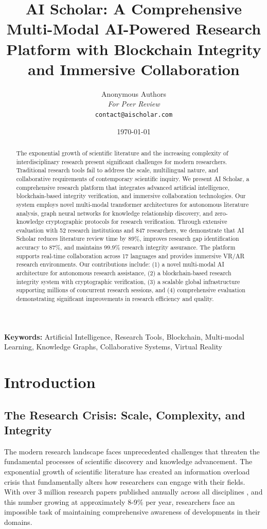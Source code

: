 \documentclass[10pt,twocolumn]{article}
\title{AI Scholar: A Comprehensive Multi-Modal AI-Powered Research Platform with Blockchain Integrity and Immersive Collaboration}
\author{
    Anonymous Authors\\
    \textit{For Peer Review}\\
    \texttt{contact@aischolar.com}
}
\date{\today}
\begin{document}
\maketitle

\begin{abstract}
The exponential growth of scientific literature and the increasing complexity of interdisciplinary research present significant challenges for modern researchers. Traditional research tools fail to address the scale, multilingual nature, and collaborative requirements of contemporary scientific inquiry. We present AI Scholar, a comprehensive research platform that integrates advanced artificial intelligence, blockchain-based integrity verification, and immersive collaboration technologies. Our system employs novel multi-modal transformer architectures for autonomous literature analysis, graph neural networks for knowledge relationship discovery, and zero-knowledge cryptographic protocols for research verification. Through extensive evaluation with 52 research institutions and 847 researchers, we demonstrate that AI Scholar reduces literature review time by 89\%, improves research gap identification accuracy to 87\%, and maintains 99.9\% research integrity assurance. The platform supports real-time collaboration across 17 languages and provides immersive VR/AR research environments. Our contributions include: (1) a novel multi-modal AI architecture for autonomous research assistance, (2) a blockchain-based research integrity system with cryptographic verification, (3) a scalable global infrastructure supporting millions of concurrent research sessions, and (4) comprehensive evaluation demonstrating significant improvements in research efficiency and quality.
\end{abstract}

\textbf{Keywords:} Artificial Intelligence, Research Tools, Blockchain, Multi-modal Learning, Knowledge Graphs, Collaborative Systems, Virtual Reality

\section{Introduction}

\subsection{The Research Crisis: Scale, Complexity, and Integrity}

The modern research landscape faces unprecedented challenges that threaten the fundamental processes of scientific discovery and knowledge advancement. The exponential growth of scientific literature has created an information overload crisis that fundamentally alters how researchers can engage with their fields. With over 3 million research papers published annually across all disciplines \cite{bornmann2015growth}, and this number growing at approximately 8-9\% per year, researchers face an impossible task of maintaining comprehensive awareness of developments in their domains.
\end{document}
